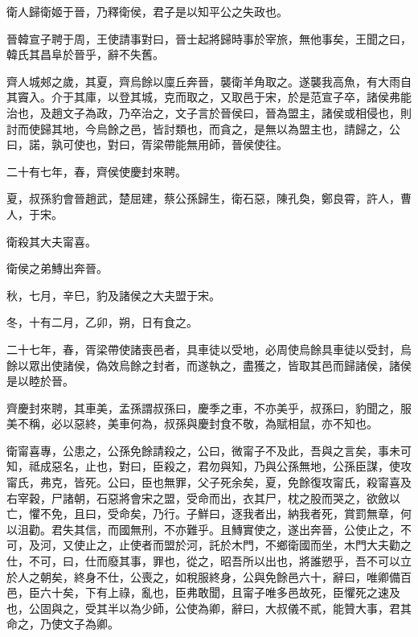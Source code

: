 \begin{pinyinscope}
衛人歸衛姬于晉，乃釋衛侯，君子是以知平公之失政也。

晉韓宣子聘于周，王使請事對曰，晉士起將歸時事於宰旅，無他事矣，王聞之曰，韓氏其昌阜於晉乎，辭不失舊。

齊人城郟之歲，其夏，齊烏餘以廩丘奔晉，襲衛羊角取之。遂襲我高魚，有大雨自其竇入。介于其庫，以登其城，克而取之，又取邑于宋，於是范宣子卒，諸侯弗能治也，及趙文子為政，乃卒治之，文子言於晉侯曰，晉為盟主，諸侯或相侵也，則討而使歸其地，今烏餘之邑，皆討類也，而貪之，是無以為盟主也，請歸之，公曰，諾，孰可使也，對曰，胥梁帶能無用師，晉侯使往。

二十有七年，春，齊侯使慶封來聘。

夏，叔孫豹會晉趙武，楚屈建，蔡公孫歸生，衛石惡，陳孔奐，鄭良霄，許人，曹人，于宋。

衛殺其大夫甯喜。

衛侯之弟鱄出奔晉。

秋，七月，辛巳，豹及諸侯之大夫盟于宋。

冬，十有二月，乙卯，朔，日有食之。

二十七年，春，胥梁帶使諸喪邑者，具車徒以受地，必周使烏餘具車徒以受封，烏餘以眾出使諸侯，偽效烏餘之封者，而遂執之，盡獲之，皆取其邑而歸諸侯，諸侯是以睦於晉。

齊慶封來聘，其車美，孟孫謂叔孫曰，慶季之車，不亦美乎，叔孫曰，豹聞之，服美不稱，必以惡終，美車何為，叔孫與慶封食不敬，為賦相鼠，亦不知也。

衛甯喜專，公患之，公孫免餘請殺之，公曰，微甯子不及此，吾與之言矣，事未可知，祗成惡名，止也，對曰，臣殺之，君勿與知，乃與公孫無地，公孫臣謀，使攻甯氏，弗克，皆死。公曰，臣也無罪，父子死余矣，夏，免餘復攻甯氏，殺甯喜及右宰穀，尸諸朝，石惡將會宋之盟，受命而出，衣其尸，枕之股而哭之，欲斂以亡，懼不免，且曰，受命矣，乃行。子鮮曰，逐我者出，納我者死，賞罰無章，何以沮勸。君失其信，而國無刑，不亦難乎。且鱄實使之，遂出奔晉，公使止之，不可，及河，又使止之，止使者而盟於河，託於木門，不鄉衛國而坐，木門大夫勸之仕，不可，曰，仕而廢其事，罪也，從之，昭吾所以出也，將誰愬乎，吾不可以立於人之朝矣，終身不仕，公喪之，如稅服終身，公與免餘邑六十，辭曰，唯卿備百邑，臣六十矣，下有上祿，亂也，臣弗敢聞，且甯子唯多邑故死，臣懼死之速及也，公固與之，受其半以為少師，公使為卿，辭曰，大叔儀不貳，能贊大事，君其命之，乃使文子為卿。


\end{pinyinscope}
